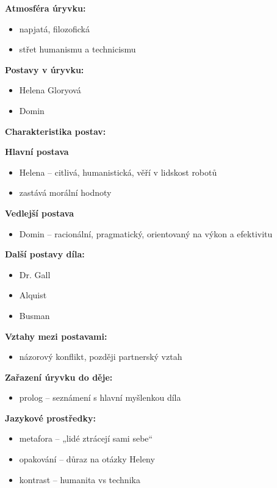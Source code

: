 \documentclass[12pt,a4paper]{article}
\begin{document}
\begin{tcolorbox}[breakable]

\textbf{Atmosféra úryvku:}
\begin{itemize}
\item napjatá, filozofická
\item střet humanismu a technicismu
\end{itemize}

\textbf{Postavy v úryvku:}
\begin{itemize}
\item Helena Gloryová
\item Domin
\end{itemize}

\textbf{Charakteristika postav:}

\textbf{Hlavní postava}
\begin{itemize}
\item Helena – citlivá, humanistická, věří v lidskost robotů
\item zastává morální hodnoty
\end{itemize}

\textbf{Vedlejší postava}
\begin{itemize}
\item Domin – racionální, pragmatický, orientovaný na výkon a efektivitu
\end{itemize}

\textbf{Další postavy díla:}
\begin{itemize}
\item Dr. Gall
\item Alquist
\item Busman
\end{itemize}

\textbf{Vztahy mezi postavami:}
\begin{itemize}
\item názorový konflikt, později partnerský vztah
\end{itemize}

\textbf{Zařazení úryvku do děje:}
\begin{itemize}
\item prolog – seznámení s hlavní myšlenkou díla
\end{itemize}

\textbf{Jazykové prostředky:}
\begin{itemize}
\item metafora – „lidé ztrácejí sami sebe“
\item opakování – důraz na otázky Heleny
\item kontrast – humanita vs technika
\end{itemize}

\end{tcolorbox}
\end{document}
